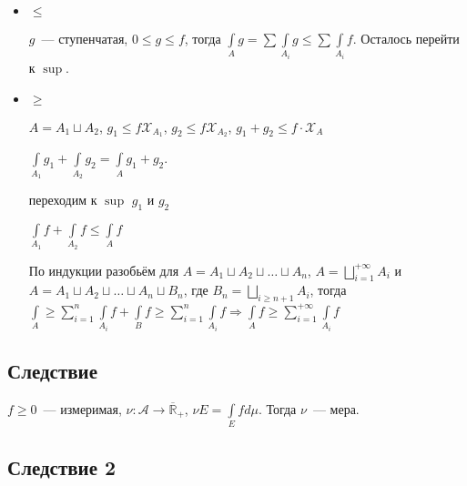 \documentclass{article}
\begin{document}
                \begin{itemize}
            
                    \item $\leqslant$
                
                        $g$~--- ступенчатая, $0 \leqslant g \leqslant f$, тогда $\int\limits_A g = \sum \int\limits_{A_i} g \leqslant \sum \int\limits_{A_i} f$. Осталось перейти к $\sup$.
                    
                    \item $\geqslant$
                
                        $A = A_1 \sqcup A_2$, $g_1 \leqslant f \mathcal{X}_{A_1}$, $g_2 \leqslant f \mathcal{X}_{A_2}$, $g_1 + g_2 \leqslant f \cdot \mathcal{X}_{A}$
                    
                        $\int\limits_{A_1} g_1 + \int\limits_{A_2} g_2 = \int\limits_{A} g_1 + g_2$.
                    
                        переходим к $\sup$ $g_1$ и $g_2$
                    
                        $\int\limits_{A_1} f + \int\limits_{A_2} f \leqslant \int\limits_{A} f$
                    
                        По индукции разобьём для $A = A_1 \sqcup A_2 \sqcup \ldots \sqcup A_n$, $A = \bigsqcup\limits^{+\infty}_{i = 1} A_i$ и $A = A_1 \sqcup A_2 \sqcup \ldots \sqcup A_n \sqcup B_n$, где $B_n = \bigsqcup\limits_{i \geqslant n + 1} A_i$, тогда $\int\limits_{A} \geqslant \sum\limits^n_{i = 1} \int\limits_{A_i} f + \int\limits_{B} f \geqslant \sum\limits^n_{i = 1} \int\limits_{A_i} f \Rightarrow \int\limits_{A}f \geqslant \sum\limits^{+\infty}_{i = 1} \int\limits_{A_i} f$
                    
                \end{itemize}
            
        \subsection{Следствие}
    
            $f \geqslant 0$~--- измеримая, $\nu : \mathcal{A} \rightarrow \overline{\mathbb{R}}_+$, $\nu E = \int\limits_{E} f d \mu$. Тогда $\nu$~--- мера.
            
        \subsection{Следствие 2}
    
\end{document}
